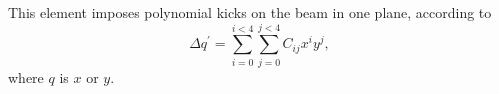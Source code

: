 This element imposes polynomial kicks on the beam in one plane, according
to
\begin{equation}
\Delta q^\prime = \sum_{i=0}^{i<4} \sum_{j=0}^{j<4} C_{ij} x^i y^j,
\end{equation}
where $q$ is $x$ or $y$.

